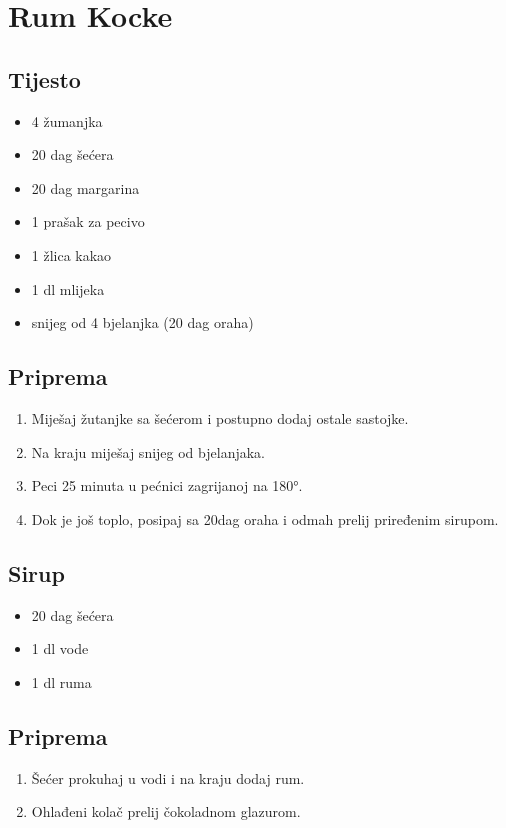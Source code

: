 \documentclass{article}
\begin{document}
\section{Rum Kocke}
\subsection{Tijesto}
\begin{itemize}
  \item 4 žumanjka
  \item 20 dag šećera
  \item 20 dag margarina
  \item 1 prašak za pecivo
  \item 1 žlica kakao
  \item 1 dl mlijeka
  \item snijeg od 4 bjelanjka (20 dag oraha)
\end{itemize}
\subsection{Priprema}
\begin{enumerate}
  \item Miješaj žutanjke sa šećerom i postupno dodaj ostale sastojke.
  \item Na kraju miješaj snijeg od bjelanjaka.
  \item Peci 25 minuta u pećnici zagrijanoj na 180°.
  \item Dok je još toplo, posipaj sa 20dag oraha i odmah prelij priređenim sirupom.
\end{enumerate}

\subsection{Sirup}
\begin{itemize}
  \item 20 dag šećera
  \item 1 dl vode
  \item 1 dl ruma
\end{itemize}

\subsection{Priprema}
\begin{enumerate}
  \item Šećer prokuhaj u vodi i na kraju dodaj rum.
  \item Ohlađeni kolač prelij čokoladnom glazurom.
\end{enumerate}
\end{document}
